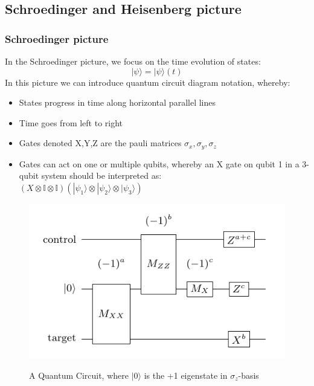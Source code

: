 \subsection{Schroedinger and Heisenberg picture}
\subsubsection{Schroedinger picture}
In the Schroedinger picture, we focus on the time evolution of states:
\begin{equation}  
	|\psi\rangle = |\psi\rangle(t) 
\end{equation}
In this picture we can introduce quantum circuit diagram notation, whereby:
\begin{itemize}
	\item States progress in time along horizontal parallel lines
	\item Time goes from left to right
	\item Gates denoted X,Y,Z are the pauli matrices 
		$\sigma_x,\sigma_y,\sigma_z$
	\item Gates can act on one or multiple qubits, whereby an X gate 
		on qubit 1 in a 3-qubit system should be interpreted as:
		\\$(X\otimes \mathbb{I} \otimes \mathbb{I}) (|\psi_1\rangle
		\otimes |\psi_2\rangle \otimes |\psi_3\rangle)$
\end{itemize}
\begin{figure}[h!]
	\begin{center}
\includegraphics[scale=0.5]{img/cnotMeasureCircuit.png}\\
	\caption{A Quantum Circuit, where $|0\rangle$ is the +1
	eigenstate in $\sigma_z$-basis}
	\label{fig:circuit1}
	\end{center}
\end{figure}
\newpage

